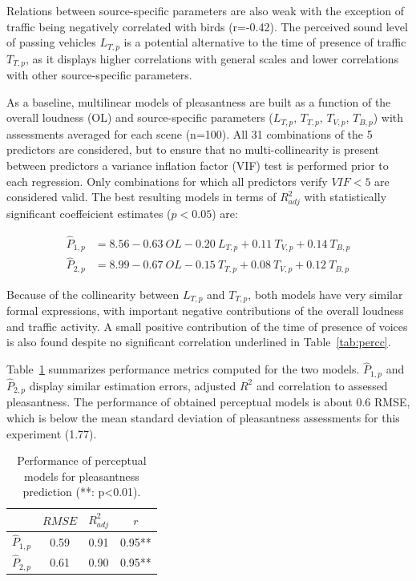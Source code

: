 \documentclass[twocolumn]{article}
\begin{document}
Relations between source-specific parameters are also weak with the exception of traffic being negatively correlated with birds (r=-0.42). The perceived sound level of passing vehicles $L_{T, p}$ is a potential alternative to the time of presence of traffic $T_{T, p}$, as it displays higher correlations with general scales and lower correlations with other source-specific parameters.

As a baseline, multilinear models of pleasantness are built as a function of the overall loudness (OL) and source-specific parameters ($L_{T, p}$, $T_{T, p}$, $T_{V, p}$, $T_{B, p}$) with assessments averaged for each scene (n=100). All 31 combinations of the 5 predictors are considered, but to ensure that no multi-collinearity is present between predictors a variance inflation factor (VIF) test is performed prior to each regression. Only combinations for which all predictors verify $VIF<5$ are considered valid. The best resulting models in terms of $R^2_{adj}$ with statistically significant coeffeicient estimates ($p<0.05$) are:

\begin{align}
\hat P_{1, p} &= 8.56 - 0.63~OL - 0.20~L_{T, p} + 0.11~T_{V, p} + 0.14~T_{B, p} \label{eq:pp1}\\
\hat P_{2, p} &= 8.99 - 0.67~OL - 0.15~T_{T, p} + 0.08~T_{V, p} + 0.12~T_{B, p} \label{eq:pp2}
\end{align}

Because of the collinearity between $L_{T, p}$ and $T_{T, p}$, both models have very similar formal expressions, with important negative contributions of the overall loudness and traffic activity. A small positive contribution of the time of presence of voices is also found despite no significant correlation underlined in Table~\ref{tab:percc}.

Table~\ref{tab:percm} summarizes performance metrics computed for the two models. $\hat P_{1, p}$ and $\hat P_{2, p}$ display similar estimation errors, adjusted $R^2$ and correlation to assessed pleasantness. The performance of obtained perceptual models is about 0.6 RMSE, which is below the mean standard deviation of pleasantness assessments for this experiment (1.77).

\begin{table}[t]
\centering
\caption{Performance of perceptual models for pleasantness prediction (**: p<0.01).}
\label{tab:percm}
\begin{tabular}{ c | c | c | c }
\hline
	 & $RMSE$ & $R^2_{adj}$ & $r$ \\ \hline
	$\hat P_{1, p}$ & 0.59 & 0.91 & 0.95** \\
	$\hat P_{2, p}$ & 0.61 & 0.90 & 0.95** \\ \hline
\end{tabular}
\end{table}
\end{document}
